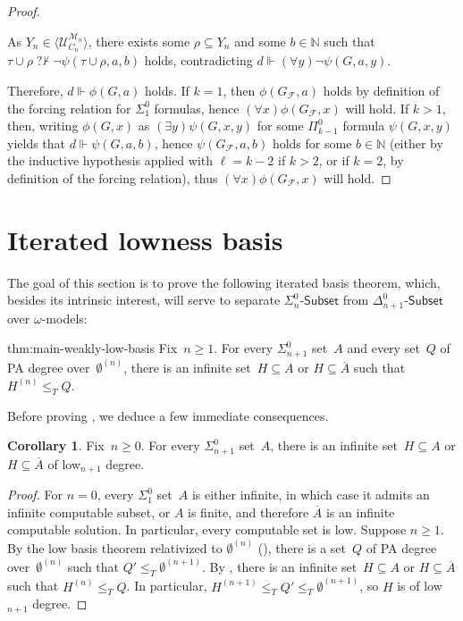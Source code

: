 \documentclass{article}
\def\NN{\mathbb{N}}
\def\F{\mathcal{F}}
\def\U{\mathcal{U}}
\def\M{\mathcal{M}}
\newcommand{\nqvdash}{\operatorname{{?}{\nvdash}}}
\newcommand{\Sub}[1]{{#1}\mbox{-}\mathsf{Subset}}
\numberwithin{theorem}{section}
\theoremstyle{definition}
\newtheorem{corollary}[theorem]{Corollary}
\begin{document}
\begin{proof}
\begin{itemize}
    As $Y_n \in \langle \U_{C_{n}}^{\M_{n}} \rangle$, there exists some $\rho\subseteq Y_n$ and some $b \in \NN$ such that $\tau \cup \rho \nqvdash \neg \psi(\tau \cup \rho, a,b)$ holds, contradicting $d \Vdash (\forall y) \neg \psi(G,a, y)$.
\end{itemize}
Therefore, $d \Vdash \phi(G,a)$ holds. If $k = 1$, then $\phi(G_{\F},a)$ holds by definition of the forcing relation for $\Sigma_1^0$ formulas, hence $(\forall x)\phi(G_{\F},x)$ will hold. If $k > 1$, then, writing $\phi(G,x)$ as $(\exists y)\psi(G,x,y)$ for some $\Pi_{k-1}^0$ formula $\psi(G,x,y)$ yields that $d \Vdash \psi(G,a,b)$, hence $\psi(G_{\F},a,b)$ holds for some $b \in \NN$ (either by the inductive hypothesis applied with $\ell = k-2$ if $k > 2$, or if $k = 2$, by definition of the forcing relation), thus $(\forall x)\phi(G_{\F},x)$ will hold. 
\end{proof}

\section{Iterated lowness basis}\label{sect:iterated-lowness}

The goal of this section is to prove the following iterated basis theorem, which, besides its intrinsic interest, will serve to separate $\Sub{\Sigma^0_n}$ from $\Sub{\Delta^0_{n+1}}$ over $\omega$-models:

\begin{repmaintheorem}{thm:main-weakly-low-basis}
Fix~$n \geq 1$. For every $\Sigma^0_{n+1}$ set~$A$ and every set~$Q$ of PA degree over~$\emptyset^{(n)}$, there is an infinite set~$H \subseteq A$ or $H \subseteq \overline{A}$ such that $H^{(n)} \leq_T Q$.
\end{repmaintheorem}

Before proving , we deduce a few immediate consequences.

\begin{corollary}\label{cor:main-low-basis}
Fix~$n \geq 0$. For every $\Sigma^0_{n+1}$ set~$A$, there is an infinite set~$H \subseteq A$ or $H \subseteq \overline{A}$ of low${}_{n+1}$ degree.
\end{corollary}
\begin{proof}
For $n = 0$, every $\Sigma^0_1$ set~$A$ is either infinite, in which case it admits an infinite computable subset, or $A$ is finite, and therefore $\overline{A}$ is an infinite computable solution. In particular, every computable set is low. Suppose $n \geq 1$.
By the low basis theorem relativized to $\emptyset^{(n)}$ (\cite{jockusch1972classes}), there is a set~$Q$ of PA degree over~$\emptyset^{(n)}$ such that $Q' \leq_T \emptyset^{(n+1)}$. By , there is an infinite set~$H \subseteq A$ or $H \subseteq \overline{A}$ such that $H^{(n)} \leq_T Q$. In particular, $H^{(n+1)} \leq_T Q' \leq_T \emptyset^{(n+1)}$, so $H$ is of low${}_{n+1}$ degree.
\end{proof}
\end{document}
